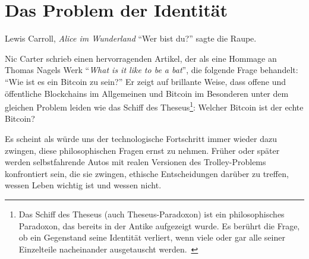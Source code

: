 \chapter{Das Problem der Identität}
\label{les:4}

\begin{chapquote}{Lewis Carroll, \textit{Alice im Wunderland}}
  \enquote{Wer bist du?} sagte die Raupe.
\end{chapquote}

Nic Carter schrieb einen hervorragenden Artikel, der als eine Hommage an Thomas
Nagels Werk \enquote{\textit{What is it like to be a bat}}, die folgende Frage behandelt:
\enquote{Wie ist es ein Bitcoin zu sein?} Er zeigt auf brillante Weise, dass
offene und öffentliche Blockchains im Allgemeinen und Bitcoin im Besonderen
unter dem gleichen Problem leiden wie das Schiff des Theseus\footnote{ Das
Schiff des Theseus (auch Theseus-Paradoxon) ist ein philosophisches Paradoxon,
das bereits in der Antike aufgezeigt wurde. Es berührt die Frage, ob ein
Gegenstand seine Identität verliert, wenn viele oder gar alle seiner Einzelteile
nacheinander ausgetauscht werden.~\cite{wiki:theseus}}: Welcher Bitcoin ist der
echte Bitcoin?

\begin{quotation}\end{quotation}

Es scheint als würde uns der technologische Fortschritt immer wieder dazu
zwingen, diese philosophischen Fragen ernst zu nehmen. Früher oder später werden
selbstfahrende Autos mit realen Versionen des Trolley-Problems konfrontiert
sein, die sie zwingen, ethische Entscheidungen darüber zu treffen, wessen Leben
wichtig ist und wessen nicht.

